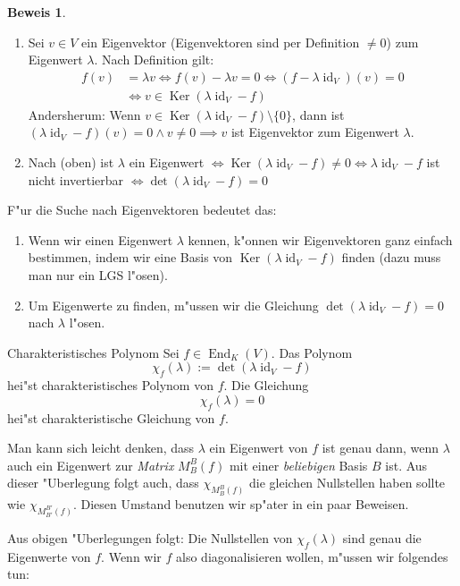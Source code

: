 \documentclass[oneside,fontsize=11pt,paper=a4,BCOR=0mm,DIV=12,automark,headsepline]{scrbook}
\DeclareMathOperator{\mKer}{Ker}
\DeclareMathOperator{\mId}{id}
\DeclareMathOperator{\mEnd}{End}
\theoremstyle{remark}
\theoremstyle{definition}
\theoremstyle{definition}
\newtheorem*{prof}{Beweis}
\theoremstyle{remark}
\begin{document}
\begin{prof}
  \begin{enumerate}
  \item Sei \(v\in V\) ein Eigenvektor (Eigenvektoren sind per Definition \(\neq 0\)) zum Eigenwert \(\lambda\). Nach Definition gilt:
    \begin{align*}
      f(v) &= \lambda v \iff f(v) - \lambda v = 0 \iff (f - \lambda\mId_V)(v) = 0 \\
      &\iff v\in \mKer(\lambda\mId_V - f)
    \end{align*}
    Andersherum: Wenn \(v \in \mKer(\lambda\mId_V -f)\setminus\{0\}\), dann ist \((\lambda\mId_V -f)(v)=0\land v\neq 0 \implies v\) ist Eigenvektor zum Eigenwert \(\lambda\).
  \item Nach (oben) ist \(\lambda\) ein Eigenwert \(\iff\mKer(\lambda\mId_V -f)\neq 0\)\(\iff \lambda\mId_V -f\) ist nicht invertierbar \(\iff\det(\lambda\mId_V - f) = 0\)
  \end{enumerate}
\end{prof}
F"ur die Suche nach Eigenvektoren bedeutet das:
\begin{enumerate}
\item Wenn wir einen Eigenwert \(\lambda\) kennen, k"onnen wir Eigenvektoren ganz einfach bestimmen, indem wir eine Basis von \(\mKer(\lambda\mId_V -f)\) finden (dazu muss man nur ein LGS l"osen).
  \item Um Eigenwerte zu finden, m"ussen wir die Gleichung \(\det(\lambda\mId_V - f) = 0\) nach \(\lambda\) l"osen.
  \end{enumerate}
\begin{definition}{Charakteristisches Polynom}{}
  Sei \(f\in\mEnd_K(V)\). Das Polynom \[\chi_f(\lambda) := \det(\lambda\mId_V-f)\] hei"st charakteristisches Polynom von \(f\). Die Gleichung \[\chi_f(\lambda) = 0\] hei"st charakteristische Gleichung von \(f\).
\end{definition}
\begin{comm}
  Man kann sich leicht denken, dass \(\lambda\) ein Eigenwert von \(f\) ist genau dann, wenn \(\lambda\) auch ein Eigenwert zur \emph{Matrix} \(M_B^B(f)\) mit einer \emph{beliebigen} Basis \(B\) ist. Aus dieser "Uberlegung folgt auch, dass \(\chi_{M_B^B(f)}\) die gleichen Nullstellen haben sollte wie \(\chi_{M_{B'}^{B'}(f)}\). Diesen Umstand benutzen wir sp"ater in ein paar Beweisen.
\end{comm}
Aus obigen "Uberlegungen folgt: Die Nullstellen von \(\chi_f(\lambda)\) sind genau die Eigenwerte von \(f\). Wenn wir \(f\) also diagonalisieren wollen, m"ussen wir folgendes tun:
\end{document}
